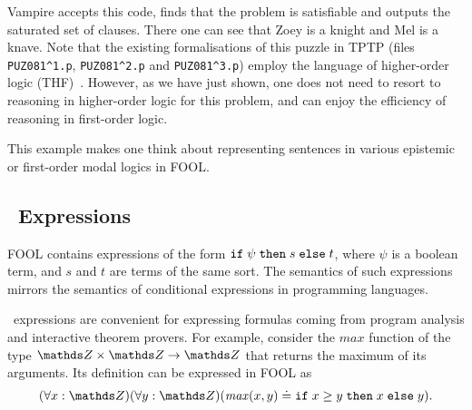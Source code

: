 Vampire accepts this code, finds that the problem is satisfiable and outputs the saturated set of clauses. There one can see that Zoey is a knight and Mel is a knave. Note that the existing formalisations of this puzzle in TPTP (files \verb'PUZ081^1.p', \verb'PUZ081^2.p' and \verb'PUZ081^3.p') employ the language of higher-order logic (THF)~\cite{THF}. However, as we have just shown, one does not need to resort to reasoning in higher-order logic for this problem, and can enjoy the efficiency of reasoning in first-order logic.

%
%
%
%
%
%
%
%

This example makes one think about representing sentences in various epistemic or first-order modal logics in FOOL.

\subsection{\ITE\ Expressions}

FOOL contains expressions of the form $\mathtt{if}\;{\psi}\;\allowbreak\mathtt{then}\;{s}\;\allowbreak\mathtt{else}\;{t}$, where $\psi$ is a boolean term, and $s$ and $t$ are terms of the same sort. The semantics of such expressions mirrors the semantics of conditional expressions in programming languages.

\ITE\ expressions are convenient for expressing formulas coming from program analysis and interactive theorem provers. For example, consider the $\mathit{max}$ function of the type $\Z \times \Z \to \Z$ that returns the maximum of its arguments. Its definition can be expressed in FOOL as
\begin{equation}\label{eq:ite-t-example}
  (\forall x:\Z)(\forall y:\Z)(\mathit{max}(x, y) \eql \ite{x \geq y}{x}{y}).
\end{equation}


